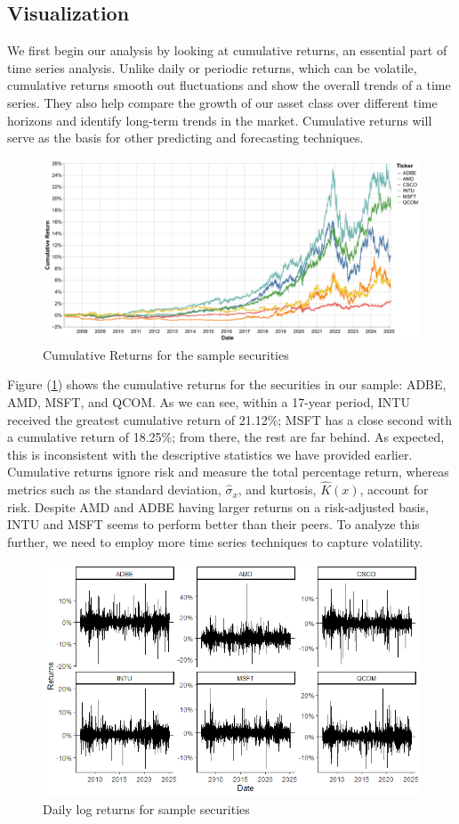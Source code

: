 \documentclass[12pt]{article}
\begin{document}
\subsection{Visualization}
We first begin our analysis by looking at cumulative returns, an essential part of time series analysis. Unlike daily or periodic returns, which can be volatile, cumulative returns smooth out fluctuations and show the overall trends of a time series. They also help compare the growth of our asset class over different time horizons and identify long-term trends in the market. Cumulative returns will serve as the basis for other predicting and forecasting techniques.
\begin{figure}[h]
	\centering
	\includegraphics[width=0.9\linewidth]{plots/cumulative_returns.png}
	\caption{Cumulative Returns for the sample securities}
	\label{fig:cum_returns}
\end{figure}
Figure (\ref{fig:cum_returns}) shows the cumulative returns for the securities in our sample: ADBE, AMD, MSFT, and QCOM. As we can see, within a 17-year period, INTU received the greatest cumulative return of 21.12\%; MSFT has a close second with a cumulative return of 18.25\%; from there, the rest are far behind. As expected, this is inconsistent with the descriptive statistics we have provided earlier. Cumulative returns ignore risk and measure the total percentage return, whereas metrics such as the standard deviation, $\hat{\sigma}_x$, and kurtosis, $\hat{K}(x)$, account for risk. Despite AMD and ADBE having larger returns on a risk-adjusted basis, INTU and MSFT seems to perform better than their peers. To analyze this further, we need to employ more time series techniques to capture volatility.
\begin{figure}[h]
	\centering
	\includegraphics[width=1\linewidth]{plots/daily_returns_alt.png}
	\caption{Daily log returns for sample securities}
	\label{fig:daily_log_returns}
\end{figure}
\end{document}
